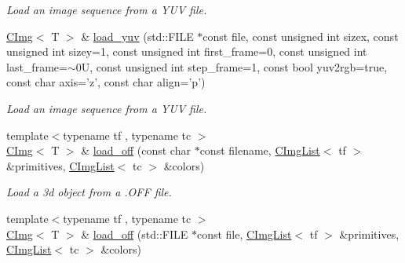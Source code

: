 \begin{DoxyCompactItemize}
\begin{DoxyCompactList}\small\item\em Load an image sequence from a YUV file. \item\end{DoxyCompactList}\item 
\hypertarget{structcimg__library_1_1CImg_a672419f53e0cf5e0408e75a163072383}{
\hyperlink{structcimg__library_1_1CImg}{CImg}$<$ T $>$ \& \hyperlink{structcimg__library_1_1CImg_a672419f53e0cf5e0408e75a163072383}{load\_\-yuv} (std::FILE $\ast$const file, const unsigned int sizex, const unsigned int sizey=1, const unsigned int first\_\-frame=0, const unsigned int last\_\-frame=$\sim$0U, const unsigned int step\_\-frame=1, const bool yuv2rgb=true, const char axis='z', const char align='p')}
\label{structcimg__library_1_1CImg_a672419f53e0cf5e0408e75a163072383}

\begin{DoxyCompactList}\small\item\em Load an image sequence from a YUV file. \item\end{DoxyCompactList}\item 
\hypertarget{structcimg__library_1_1CImg_a80d901c64defb74a1fc154fc8beb71a4}{
{\footnotesize template$<$typename tf , typename tc $>$ }\\\hyperlink{structcimg__library_1_1CImg}{CImg}$<$ T $>$ \& \hyperlink{structcimg__library_1_1CImg_a80d901c64defb74a1fc154fc8beb71a4}{load\_\-off} (const char $\ast$const filename, \hyperlink{structcimg__library_1_1CImgList}{CImgList}$<$ tf $>$ \&primitives, \hyperlink{structcimg__library_1_1CImgList}{CImgList}$<$ tc $>$ \&colors)}
\label{structcimg__library_1_1CImg_a80d901c64defb74a1fc154fc8beb71a4}

\begin{DoxyCompactList}\small\item\em Load a 3d object from a .OFF file. \item\end{DoxyCompactList}\item 
\hypertarget{structcimg__library_1_1CImg_ac9925dc619f674e8c65c21227f1fbd75}{
{\footnotesize template$<$typename tf , typename tc $>$ }\\\hyperlink{structcimg__library_1_1CImg}{CImg}$<$ T $>$ \& \hyperlink{structcimg__library_1_1CImg_ac9925dc619f674e8c65c21227f1fbd75}{load\_\-off} (std::FILE $\ast$const file, \hyperlink{structcimg__library_1_1CImgList}{CImgList}$<$ tf $>$ \&primitives, \hyperlink{structcimg__library_1_1CImgList}{CImgList}$<$ tc $>$ \&colors)}
\label{structcimg__library_1_1CImg_ac9925dc619f674e8c65c21227f1fbd75}


\end{DoxyCompactItemize}
